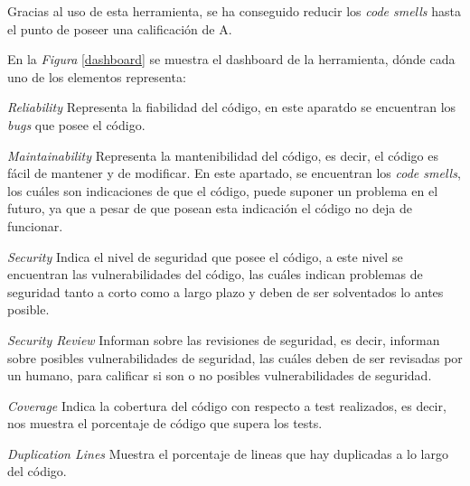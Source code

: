 
Gracias al uso de esta herramienta, se ha conseguido reducir los \textit{code smells} hasta el punto de poseer una calificación de A.

En la \textit{Figura} \ref{dashboard} se muestra el dashboard de la herramienta, dónde cada uno de los elementos representa:

\begin{list}{\textbullet}{ %
    \addtolength{\itemsep}{-2mm} %
    \setlength{\itemindent}{2mm}}

    \item \textit{Reliability} Representa la fiabilidad del código, en este aparatdo se encuentran los \textit{bugs} que posee el código.
    \item \textit{Maintainability} Representa la mantenibilidad del código, es decir, el código es fácil de mantener y de modificar. En este apartado, se encuentran los \textit{code smells}, los cuáles son indicaciones de que el código, puede suponer un problema en el futuro, ya que a pesar de que posean esta indicación el código no deja de funcionar.
    \item \textit{Security} Indica el nivel de seguridad que posee el código, a este nivel se encuentran las vulnerabilidades del código, las cuáles indican problemas de seguridad tanto a corto como a largo plazo y deben de ser solventados lo antes posible.
    \item \textit{Security Review} Informan sobre las revisiones de seguridad, es decir, informan sobre posibles vulnerabilidades de seguridad, las cuáles deben de ser revisadas por un humano, para calificar si son o no posibles vulnerabilidades de seguridad.
    \item \textit{Coverage} Indica la cobertura del código con respecto a test realizados, es decir, nos muestra el porcentaje de código que supera los tests.
    \item \textit{Duplication Lines} Muestra el porcentaje de lineas que hay duplicadas a lo largo del código.
\end{list}